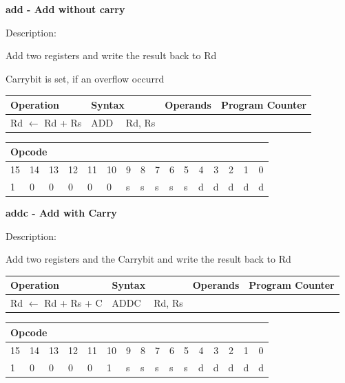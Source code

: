 \documentclass[%
	pdftex,
	a4paper,
	oneside,
	bibtotoc,%
	idxtotoc,%
	bibtotocnumbered,
	halfparskip,%
]{scrbook}
\begin{document}
\bigskip

\textbf{add - Add without carry}

Description:

Add two registers and write the result back to Rd

Carrybit is set, if an overflow occurrd

\begin{tabular}{|l|l|l|l|}
\hline
Operation & Syntax & Operands & Program Counter \\ \hline
Rd $\leftarrow $ Rd + Rs & ADD \ \ Rd, Rs &  &  \\ \hline
\end{tabular}

\begin{tabular}{|c|c|c|c|c|c|c|c|c|c|c|c|c|c|c|c|}
\hline
\multicolumn{6}{|l|}{Opcode} & \multicolumn{5}{|l|}{} & \multicolumn{5}{|l|}{
} \\ \hline
15 & 14 & 13 & 12 & 11 & 10 & 9 & 8 & 7 & 6 & 5 & 4 & 3 & 2 & 1 & 0 \\ \hline
\multicolumn{1}{|l|}{1} & \multicolumn{1}{|l|}{0} & \multicolumn{1}{|l|}{0}
& \multicolumn{1}{|l|}{0} & \multicolumn{1}{|l|}{0} & \multicolumn{1}{|l|}{0}
& \multicolumn{1}{|l|}{s} & \multicolumn{1}{|l|}{s} & \multicolumn{1}{|l|}{s}
& \multicolumn{1}{|l|}{s} & \multicolumn{1}{|l|}{s} & \multicolumn{1}{|l|}{d}
& \multicolumn{1}{|l|}{d} & \multicolumn{1}{|l|}{d} & \multicolumn{1}{|l|}{d}
& \multicolumn{1}{|l|}{d} \\ \hline
\end{tabular}

\bigskip

\textbf{addc - Add with Carry}

Description:

Add two registers and the Carrybit and write the result back to Rd

\begin{tabular}{|l|l|l|l|}
\hline
Operation & Syntax & Operands & Program Counter \\ \hline
Rd $\leftarrow $ Rd + Rs + C & ADDC \ \ Rd, Rs &  &  \\ \hline
\end{tabular}

\begin{tabular}{|c|c|c|c|c|c|c|c|c|c|c|c|c|c|c|c|}
\hline
\multicolumn{6}{|l|}{Opcode} & \multicolumn{5}{|l|}{} & \multicolumn{5}{|l|}{
} \\ \hline
15 & 14 & 13 & 12 & 11 & 10 & 9 & 8 & 7 & 6 & 5 & 4 & 3 & 2 & 1 & 0 \\ \hline
\multicolumn{1}{|l|}{1} & \multicolumn{1}{|l|}{0} & \multicolumn{1}{|l|}{0}
& \multicolumn{1}{|l|}{0} & \multicolumn{1}{|l|}{0} & \multicolumn{1}{|l|}{1}
& \multicolumn{1}{|l|}{s} & \multicolumn{1}{|l|}{s} & \multicolumn{1}{|l|}{s}
& \multicolumn{1}{|l|}{s} & \multicolumn{1}{|l|}{s} & \multicolumn{1}{|l|}{d}
& \multicolumn{1}{|l|}{d} & \multicolumn{1}{|l|}{d} & \multicolumn{1}{|l|}{d}
& \multicolumn{1}{|l|}{d} \\ \hline
\end{tabular}
\end{document}
